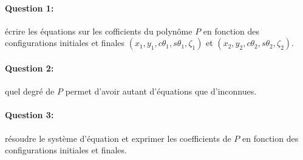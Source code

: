 \documentclass {article}
\begin{document}
\paragraph {Question 1:} écrire les équations sur les cofficients du polyn\^ome $P$ en fonction des configurations initiales et finales $(x_1,y_1,c\theta_1,s\theta_1,\zeta_1)$ et $(x_2,y_2,c\theta_2,s\theta_2,\zeta_2)$.

\paragraph {Question 2:} quel degré de $P$ permet d'avoir autant d'équations que d'inconnues.

\paragraph {Question 3:} résoudre le système d'équation et exprimer les coefficients de $P$ en fonction des configurations initiales et finales.
\end{document}
